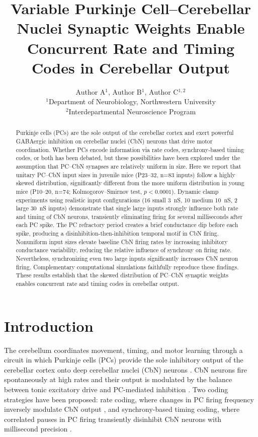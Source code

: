 \documentclass[11pt]{article}
\title{Variable Purkinje Cell--Cerebellar Nuclei Synaptic Weights Enable Concurrent Rate and Timing Codes in Cerebellar Output}
\author{Author A$^{1}$, Author B$^{1}$, Author C$^{1,2}$\\[6pt]
$^{1}$Department of Neurobiology, Northwestern University\\
$^{2}$Interdepartmental Neuroscience Program}
\date{}
\begin{document}
\maketitle

\begin{abstract}
Purkinje cells (PCs) are the sole output of the cerebellar cortex and exert powerful GABAergic inhibition on cerebellar nuclei (CbN) neurons that drive motor coordination. Whether PCs encode information via rate codes, synchrony-based timing codes, or both has been debated, but these possibilities have been explored under the assumption that PC--CbN synapses are relatively uniform in size. Here we report that unitary PC--CbN input sizes in juvenile mice (P23--32, n=83 inputs) follow a highly skewed distribution, significantly different from the more uniform distribution in young mice (P10--20, n=74; Kolmogorov--Smirnov test, $p<0.0001$). Dynamic clamp experiments using realistic input configurations (16 small 3~nS, 10 medium 10~nS, 2 large 30~nS inputs) demonstrate that single large inputs strongly influence both rate and timing of CbN neurons, transiently eliminating firing for several milliseconds after each PC spike. The PC refractory period creates a brief conductance dip before each spike, producing a disinhibition-then-inhibition temporal motif in CbN firing. Nonuniform input sizes elevate baseline CbN firing rates by increasing inhibitory conductance variability, reducing the relative influence of synchrony on firing rate. Nevertheless, synchronizing even two large inputs significantly increases CbN neuron firing. Complementary computational simulations faithfully reproduce these findings. These results establish that the skewed distribution of PC--CbN synaptic weights enables concurrent rate and timing codes in cerebellar output.
\end{abstract}

\section{Introduction}

The cerebellum coordinates movement, timing, and motor learning through a circuit in which Purkinje cells (PCs) provide the sole inhibitory output of the cerebellar cortex onto deep cerebellar nuclei (CbN) neurons \citep{ito2008control, delong2003progress}. CbN neurons fire spontaneously at high rates and their output is modulated by the balance between tonic excitatory drive and PC-mediated inhibition \citep{gauck2000role, raman2000resurgent}. Two coding strategies have been proposed: rate coding, where changes in PC firing frequency inversely modulate CbN output \citep{thach1968discharge, herzfeld2015encoding}, and synchrony-based timing coding, where correlated pauses in PC firing transiently disinhibit CbN neurons with millisecond precision \citep{person2012purkinje, heck2007contributions}.
\end{document}
